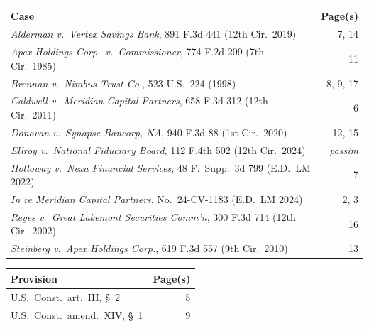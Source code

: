 \documentclass[12pt]{article}
\newcommand{\courtcase}[1]{\textit{#1}}
\begin{document}
\begin{tcolorbox}[legalbox, title={Cases}]

\begin{tabularx}{\linewidth}{@{} X r @{}}
  \toprule
  \rowcolor{NavyDeep!8}
  \textbf{\color{NavyDeep} Case} & \textbf{\color{NavyDeep} Page(s)} \\
  \midrule
  \courtcase{Alderman v.\ Vertex Savings Bank}, 891 F.3d 441 (12th Cir.\ 2019) & 7, 14 \\[3pt]
  \courtcase{Apex Holdings Corp.\ v.\ Commissioner}, 774 F.2d 209 (7th Cir.\ 1985) & 11 \\[3pt]
  \rowcolor{NavyDeep!4}
  \courtcase{Brennan v.\ Nimbus Trust Co.}, 523 U.S.\ 224 (1998) & 8, 9, 17 \\[3pt]
  \courtcase{Caldwell v.\ Meridian Capital Partners}, 658 F.3d 312 (12th Cir.\ 2011) & 6 \\[3pt]
  \rowcolor{NavyDeep!4}
  \courtcase{Donovan v.\ Synapse Bancorp, NA}, 940 F.3d 88 (1st Cir.\ 2020) & 12, 15 \\[3pt]
  \courtcase{Ellroy v.\ National Fiduciary Board}, 112 F.4th 502 (12th Cir.\ 2024) & \textit{passim} \\[3pt]
  \rowcolor{NavyDeep!4}
  \courtcase{Holloway v.\ Nexa Financial Services}, 48 F.\ Supp.\ 3d 799 (E.D.\ LM 2022) & 7 \\[3pt]
  \courtcase{In re Meridian Capital Partners}, No.\ 24-CV-1183 (E.D.\ LM 2024) & 2, 3 \\[3pt]
  \rowcolor{NavyDeep!4}
  \courtcase{Reyes v.\ Great Lakemont Securities Comm'n}, 300 F.3d 714 (12th Cir.\ 2002) & 16 \\[3pt]
  \courtcase{Steinberg v.\ Apex Holdings Corp.}, 619 F.3d 557 (9th Cir.\ 2010) & 13 \\[3pt]
  \bottomrule
\end{tabularx}

\end{tcolorbox}

\vspace{12pt}

\begin{tcolorbox}[legalbox, title={Constitutional Provisions}]

\begin{tabularx}{\linewidth}{@{} X r @{}}
  \toprule
  \rowcolor{NavyDeep!8}
  \textbf{\color{NavyDeep} Provision} & \textbf{\color{NavyDeep} Page(s)} \\
  \midrule
  U.S.\ Const.\ art.\ III, \S\ 2 & 5 \\[3pt]
  U.S.\ Const.\ amend.\ XIV, \S\ 1 & 9 \\[3pt]
  \bottomrule
\end{tabularx}

\end{tcolorbox}
\end{document}
